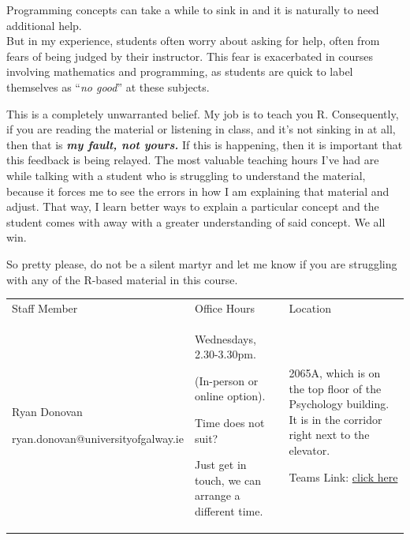 \documentclass[
]{book}
\begin{document}
Programming concepts can take a while to sink in and it is naturally to need additional help.\\
But in my experience, students often worry about asking for help, often from fears of being judged by their instructor.
This fear is exacerbated in courses involving mathematics and programming, as students are quick to label themselves as ``\emph{no good}'' at these subjects.

This is a completely unwarranted belief.
My job is to teach you R.
Consequently, if you are reading the material or listening in class, and it's not sinking in at all, then that is \textbf{\emph{my fault, not yours.}} If this is happening, then it is important that this feedback is being relayed.
The most valuable teaching hours I've had are while talking with a student who is struggling to understand the material, because it forces me to see the errors in how I am explaining that material and adjust. That way, I learn better ways to explain a particular concept and the student comes with away with a greater understanding of said concept.
We all win.

So pretty please, do not be a silent martyr and let me know if you are struggling with any of the R-based material in this course.

\begin{longtable}[]{@{}
  >{\raggedright\arraybackslash}p{}
  >{\raggedright\arraybackslash}p{}
  >{\raggedright\arraybackslash}p{}@{}}
\toprule\noalign{}
\endhead
\bottomrule\noalign{}
\endlastfoot
Staff Member & Office Hours & Location \\
Ryan Donovan

ryan.donovan@universityofgalway.ie & Wednesdays, 2.30-3.30pm.

(In-person or online option).

Time does not suit?

Just get in touch, we can arrange a different time. & 2065A, which is on the top floor of the Psychology building. It is in the corridor right next to the elevator.

Teams Link: \href{https://teams.microsoft.com/l/meetup-join/19\%3ameeting_NDQ1YjRiNmQtNDQ4MC00NjgzLWIwYTQtNWI5OTg3ZmE1NWRj\%40thread.v2/0?context=\%7b\%22Tid\%22\%3a\%2213e3b186-c446-4aab-9c6d-9ab9bb76816c\%22\%2c\%22Oid\%22\%3a\%22c088ea08-9d92-460e-8972-64cd26bc4899\%22\%7d}{click here} \\
\end{longtable}
\end{document}
